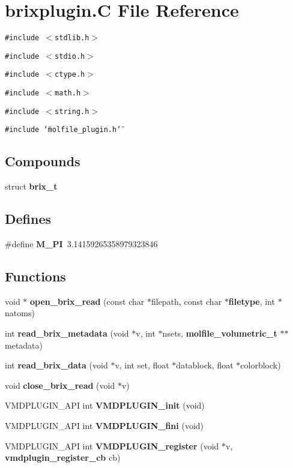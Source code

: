 \section{brixplugin.C File Reference}
\label{brixplugin_8C}
{\tt \#include $<$stdlib.h$>$}\par
{\tt \#include $<$stdio.h$>$}\par
{\tt \#include $<$ctype.h$>$}\par
{\tt \#include $<$math.h$>$}\par
{\tt \#include $<$string.h$>$}\par
{\tt \#include \char`\"{}molfile\_\-plugin.h\char`\"{}}\par
\subsection*{Compounds}
\begin{CompactItemize}
\item 
struct {\bf brix\_\-t}
\end{CompactItemize}
\subsection*{Defines}
\begin{CompactItemize}
\item 
\#define {\bf M\_\-PI}\ 3.14159265358979323846
\end{CompactItemize}
\subsection*{Functions}
\begin{CompactItemize}
\item 
void $\ast$ {\bf open\_\-brix\_\-read} (const char $\ast$filepath, const char $\ast${\bf filetype}, int $\ast$natoms)
\item 
int {\bf read\_\-brix\_\-metadata} (void $\ast$v, int $\ast$nsets, {\bf molfile\_\-volumetric\_\-t} $\ast$$\ast$metadata)
\item 
int {\bf read\_\-brix\_\-data} (void $\ast$v, int set, float $\ast$datablock, float $\ast$colorblock)
\item 
void {\bf close\_\-brix\_\-read} (void $\ast$v)
\item 
VMDPLUGIN\_\-API int {\bf VMDPLUGIN\_\-init} (void)
\item 
VMDPLUGIN\_\-API int {\bf VMDPLUGIN\_\-fini} (void)
\item 
VMDPLUGIN\_\-API int {\bf VMDPLUGIN\_\-register} (void $\ast$v, {\bf vmdplugin\_\-register\_\-cb} cb)
\end{CompactItemize}
